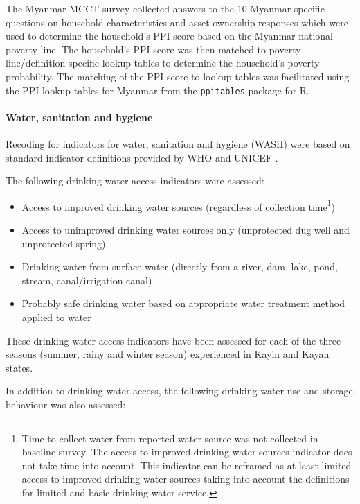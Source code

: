 \documentclass[12pt,a4paper]{article}
\let\oldparagraph\paragraph
\renewcommand{\paragraph}[1]{\oldparagraph{#1}\mbox{}}
\let\rmarkdownfootnote\footnote%
\def\footnote{\protect\rmarkdownfootnote}
\begin{document}
The Myanmar MCCT survey collected answers to the 10 Myanmar-specific questions on household characteristics and asset ownership responses which were used to determine the household's PPI score based on the Myanmar national poverty line. The household's PPI score was then matched to poverty line/definition-specific lookup tables to determine the household's poverty probability. The matching of the PPI score to lookup tables was facilitated using the PPI lookup tables for Myanmar from the \texttt{ppitables} package \citep{Guevarra2019} for R.

\hypertarget{wash}{%
\paragraph{Water, sanitation and hygiene}\label{wash}}

Recoding for indicators for water, sanitation and hygiene (WASH) were based on standard indicator definitions provided by WHO and UNICEF \citep{WHOUNICEFJointMonitoringProgrammeforWaterSupplyandSanitation:2018vr, WorldHealthOrganization:2006vv}.

The following drinking water access indicators were assessed:

\begin{itemize}
\item
  Access to improved drinking water sources (regardless of collection time\footnote{Time to collect water from reported water source was not collected in baseline survey. The access to improved drinking water sources indicator does not take time into account. This indicator can be reframed as at least limited access to improved drinking water sources taking into account the definitions for limited and basic drinking water service.})
\item
  Access to unimproved drinking water sources only (unprotected dug well and unprotected spring)
\item
  Drinking water from surface water (directly from a river, dam, lake, pond, stream, canal/irrigation canal)
\item
  Probably safe drinking water based on appropriate water treatment method applied to water
\end{itemize}

These drinking water access indicators have been assessed for each of the three seasons (summer, rainy and winter season) experienced in Kayin and Kayah states.

In addition to drinking water access, the following drinking water use and storage behaviour was also assessed:
\end{document}
